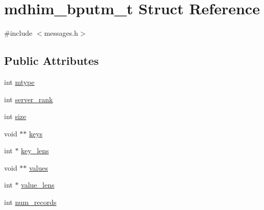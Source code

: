 \hypertarget{structmdhim__bputm__t}{\section{mdhim\-\_\-bputm\-\_\-t Struct Reference}
\label{d1/ddf/structmdhim__bputm__t}
}


{\ttfamily \#include $<$messages.\-h$>$}

\subsection*{Public Attributes}
\begin{DoxyCompactItemize}
\item 
int \hyperlink{structmdhim__bputm__t_a84865663becc6cfd06c5c7667b37244d}{mtype}
\item 
int \hyperlink{structmdhim__bputm__t_afd28a1e8797725473429ebed5ccc6800}{server\-\_\-rank}
\item 
int \hyperlink{structmdhim__bputm__t_a480571293980863083cce4de0287a9c3}{size}
\item 
void $\ast$$\ast$ \hyperlink{structmdhim__bputm__t_a6cd17a8565bb662fdb1d52d878ce2a3d}{keys}
\item 
int $\ast$ \hyperlink{structmdhim__bputm__t_a528ae69dc41eab9b8e8d523d67debeac}{key\-\_\-lens}
\item 
void $\ast$$\ast$ \hyperlink{structmdhim__bputm__t_a1b908d082b136370db7574dc25d44853}{values}
\item 
int $\ast$ \hyperlink{structmdhim__bputm__t_a915478fbead386af153b4b3989ff7fb6}{value\-\_\-lens}
\item 
int \hyperlink{structmdhim__bputm__t_ad075b00254b3f26231b57134995d017b}{num\-\_\-records}
\end{DoxyCompactItemize}


